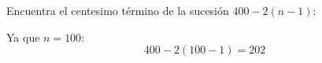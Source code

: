 Encuentra el centesimo término de la sucesión $400-2(n-1)$:

\begin{solutionbox}{1.6cm}
    Ya que $n=100$:
    \[ 400-2(100-1)=202 \]
\end{solutionbox}
